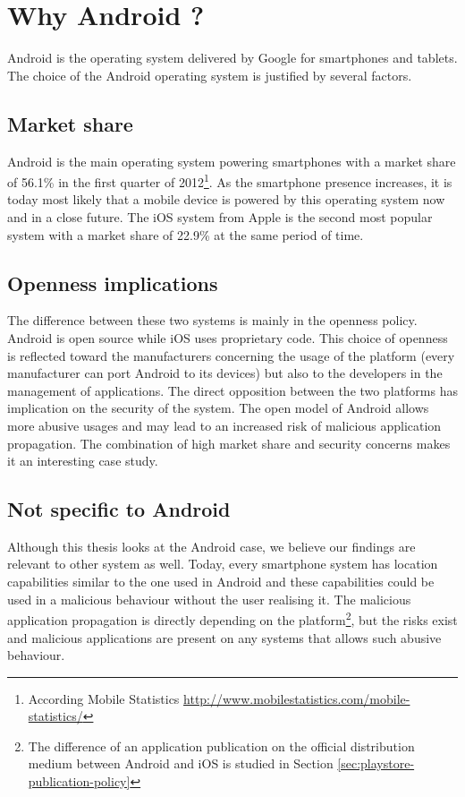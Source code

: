 \section*{Why Android ?}
\label{sec:why-android}

Android is the operating system delivered by Google for smartphones and tablets.
The choice of the Android operating system is justified by several factors.\\

\subsection*{Market share}

Android is the main operating system powering smartphones with a market share of 56.1\% in the first quarter of 2012\footnote{According Mobile Statistics \url{http://www.mobilestatistics.com/mobile-statistics/}}.
As the smartphone presence increases, it is today most likely that a mobile device is powered by this operating system now and in a close future.
The iOS system from Apple is the second most popular system with a market share of 22.9\% at the same period of time.\\

\subsection*{Openness implications}
The difference between these two systems is mainly in the openness policy.
Android is open source while iOS uses proprietary code.
This choice of openness is reflected toward the manufacturers concerning the usage of the platform (every manufacturer can port Android to its devices) but also to the developers in the management of applications.
The direct opposition between the two platforms has implication on the security of the system.
The open model of Android allows more abusive usages and may lead to an increased risk of malicious application propagation.
The combination of high market share and security concerns makes it an interesting case study.\\

\subsection*{Not specific to Android}
Although this thesis looks at the Android case, we believe our findings are relevant to other system as well.
Today, every smartphone system has location capabilities similar to the one used in Android and these capabilities could be used in a malicious behaviour without the user realising it.
The malicious application propagation is directly depending on the platform\footnote{The difference of an application publication on the official distribution medium between Android and iOS is studied in Section \ref{sec:playstore-publication-policy}}, but the risks exist and malicious applications are present on any systems that allows such abusive behaviour.


